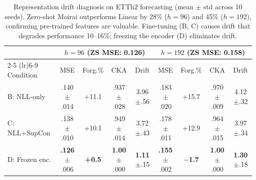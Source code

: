 \begin{table}[t]
\centering
\caption{Representation drift diagnosis on ETTh2 forecasting (mean $\pm$ std across 10 seeds).
Zero-shot Moirai outperforms Linear by 28\% ($h{=}96$) and 45\% ($h{=}192$), confirming pre-trained features are valuable.
Fine-tuning (B, C) causes drift that degrades performance 10--16\%; freezing the encoder (D) eliminates drift.}
\label{tab:forecasting_forgetting}
\small
\begin{tabular}{l cccc cccc}
\toprule
& \multicolumn{4}{c}{$h=96$ (ZS MSE: 0.126)} & \multicolumn{4}{c}{$h=192$ (ZS MSE: 0.158)} \\
\cmidrule(lr){2-5} \cmidrule(lr){6-9}
Condition & MSE & Forg.\% & CKA & Drift & MSE & Forg.\% & CKA & Drift \\
\midrule
B: NLL-only    & .140{\tiny$\pm$.014} & +11.1  & .937{\tiny$\pm$.028} & 3.96{\tiny$\pm$.56}
               & .183{\tiny$\pm$.020} & +15.7 & .970{\tiny$\pm$.009} & 4.12{\tiny$\pm$.32} \\
C: NLL+SupCon  & .138{\tiny$\pm$.010} & +10.1  & .949{\tiny$\pm$.014} & 3.72{\tiny$\pm$.43}
               & .178{\tiny$\pm$.011} & +12.9 & .964{\tiny$\pm$.015} & 3.97{\tiny$\pm$.34} \\
D: Frozen enc. & \textbf{.126}{\tiny$\pm$.006} & \textbf{+0.5}  & \textbf{1.00}{\tiny$\pm$.000} & \textbf{1.11}{\tiny$\pm$.15}
               & \textbf{.155}{\tiny$\pm$.002} & \textbf{$-$1.7} & \textbf{1.00}{\tiny$\pm$.000} & \textbf{1.30}{\tiny$\pm$.18} \\
\bottomrule
\end{tabular}
\end{table}

